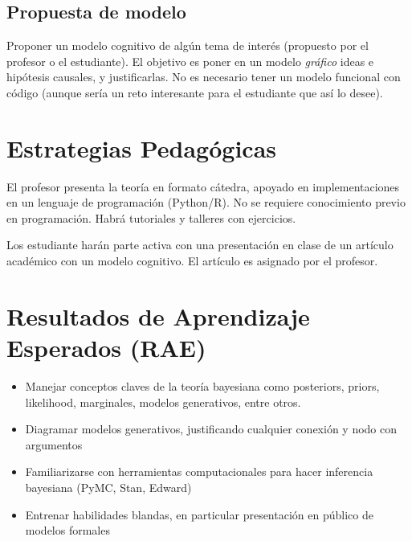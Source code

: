 \documentclass[letterpaper]{inzane_syllabus} %
\begin{document}
\subsection{Propuesta de modelo}
Proponer un modelo cognitivo de alg\'un tema de inter\'es (propuesto por el profesor o el estudiante). El objetivo es poner en un modelo \textit{gr\'afico} ideas e hip\'otesis causales, y justificarlas. No es necesario tener un modelo funcional con c\'odigo (aunque ser\'ia un reto interesante para el estudiante que as\'i lo desee).

\vspace{0.75cm}
\section{Estrategias Pedag\'ogicas}

El profesor presenta la teor\'ia en formato cátedra, apoyado en implementaciones en un lenguaje de programaci\'on (Python/R). No se requiere conocimiento previo en programaci\'on. Habr\'a tutoriales y talleres con ejercicios.  

Los estudiante har\'an parte activa con una presentaci\'on en clase de un art\'iculo acad\'emico con un modelo cognitivo. El art\'iculo es asignado por el profesor. 

\vspace{0.75cm}
\section{Resultados de Aprendizaje Esperados (RAE)}

\begin{itemize}
\item Manejar conceptos claves de la teoría bayesiana como posteriors, priors, likelihood, marginales, modelos generativos, entre otros.
\item Diagramar modelos generativos, justificando cualquier conexi\'on y nodo con argumentos
\item Familiarizarse con herramientas computacionales para hacer inferencia bayesiana (PyMC, Stan, Edward)
\item Entrenar habilidades blandas, en particular presentaci\'on en p\'ublico de modelos formales

\end{itemize}

\vspace{0.75cm}
\end{document}
